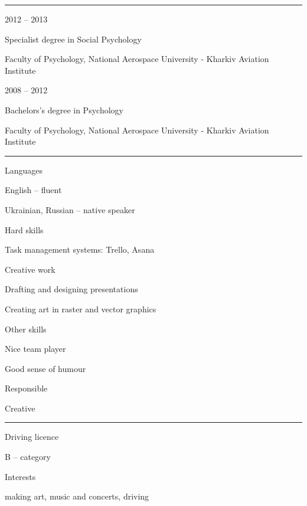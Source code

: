 \documentclass[a4paper,10pt]{article}
\newlength{\cvcolumngapwidth}
\newlength{\cvleftcolumnwidth}
\newlength{\cvrightcolumnwidth}
\newcommand{\cvsectionstyle}[1]{{\normalsize\cvsectionfont\textcolor{cvsectioncolor}{#1}}}
\newcommand{\cvtitlestyle}[1]{{\large\cvtitlefont\textcolor{cvtitlecolor}{#1}}}
\newcommand{\cvdurationstyle}[1]{{\small\cvdurationfont\textcolor{cvdurationcolor}{#1}}}
\newcommand{\cvheadingstyle}[1]{{\normalsize\cvheadingfont\textcolor{cvheadingcolor}{#1}}}
\newlength{\cvafteritemskipamount}
\newlength{\cvaftersectionskipamount}
\newlength{\cvbetweensectionandheadingextraskipamount}
\newlength{\cvaftertitleskipamount}
\newlength{\cvparskip}
\newcommand{\cvsection}[1]{
    \begin{minipage}[t]{\cvleftcolumnwidth}
        \raggedleft\cvsectionstyle{#1}
    \end{minipage}%
    \hspace{\cvcolumngapwidth}%
    \begin{minipage}[t]{\cvrightcolumnwidth}
        \textcolor{cvrulecolor}{\rule{\cvrightcolumnwidth}{0.3mm}}
    \end{minipage}

    \vspace{\cvaftersectionskipamount}
}
\newcommand{\cvitem}[2]{
    \begin{minipage}[t]{\cvleftcolumnwidth}
        \raggedleft #1
    \end{minipage}%
    \hspace{\cvcolumngapwidth}%
    \begin{minipage}[t]{\cvrightcolumnwidth}
        \setlength{\parskip}{\cvparskip} #2
    \end{minipage}

    \vspace{\cvafteritemskipamount}
}
\newcommand{\cvtitle}[1]{
    \cvtitlestyle{#1}

    \vspace{\cvaftertitleskipamount}
    \vspace{-\cvparskip}
}
\begin{document}
\cvsection{EDUCATION}

\cvitem{
    \cvdurationstyle{2012 -- 2013}
}{
    \cvtitle{Specialist degree in Social Psychology}

    Faculty of Psychology, National Aerospace University - Kharkiv Aviation Institute
}

\cvitem{
    \cvdurationstyle{2008 -- 2012}
}{
    \cvtitle{Bachelors's degree in Psychology}

    Faculty of Psychology, National Aerospace University - Kharkiv Aviation Institute
}



\cvsection{SKILLS}

\vspace{\cvbetweensectionandheadingextraskipamount}

\cvitem{
    \cvheadingstyle{Languages}
}{
    English -- fluent 


    Ukrainian, Russian -- native speaker
}

\cvitem{
    \cvheadingstyle{Hard skills}
}{
    Task management systems: Trello, Asana
  
    Creative work

    Drafting and designing
presentations

Creating art in raster and vector graphics

}
\cvitem{
    \cvheadingstyle{Other skills}
}{
    Nice team player
    

    Good sense of humour
    
   Responsible 
   
   Creative
}



\cvsection{ADDITIONAL INFORMATION}

\vspace{\cvbetweensectionandheadingextraskipamount}

\cvitem{
    \cvheadingstyle{Driving licence}
}{
    B -- category
}

\cvitem{
    \cvheadingstyle{Interests}
}{
    making art, music and concerts, driving 
}
\end{document}
